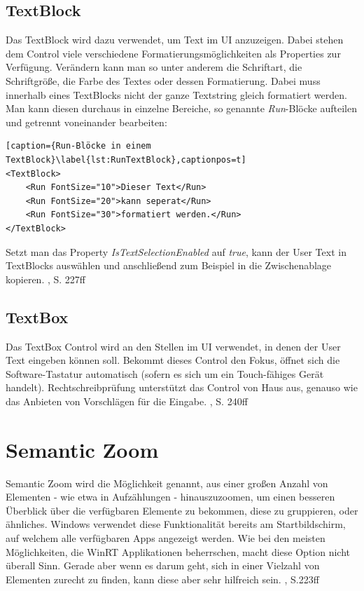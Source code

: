 \documentclass[a4paper,bibtotoc,oneside]{scrbook}
\begin{document}
\subsection[TextBlock]{TextBlock}
Das TextBlock wird dazu verwendet, um Text im UI anzuzeigen. Dabei stehen dem Control viele verschiedene Formatierungsmöglichkeiten als Properties zur Verfügung. Verändern kann man so unter anderem die Schriftart, die Schriftgröße, die Farbe des Textes oder dessen Formatierung.
\newline
Dabei muss innerhalb eines TextBlocks nicht der ganze Textstring gleich formatiert werden. Man kann diesen durchaus in einzelne Bereiche, so genannte \textit{Run}-Blöcke aufteilen und getrennt voneinander bearbeiten:
\newline
\begin{lstlisting}[caption={Run-Blöcke in einem TextBlock}\label{lst:RunTextBlock},captionpos=t]
<TextBlock>
	<Run FontSize="10">Dieser Text</Run>
	<Run FontSize="20">kann seperat</Run>
	<Run FontSize="30">formatiert werden.</Run>
</TextBlock>
\end{lstlisting}
Setzt man das Property \textit{IsTextSelectionEnabled} auf \textit{true}, kann der User Text in TextBlocks auswählen und anschließend zum Beispiel in die Zwischenablage kopieren.
\cite{ana12}, S. 227ff

\subsection[TextBox]{TextBox}
Das TextBox Control wird an den Stellen im UI verwendet, in denen der User Text eingeben können soll. Bekommt dieses Control den Fokus, öffnet sich die Software-Tastatur automatisch (sofern es sich um ein Touch-fähiges Gerät handelt). Rechtschreibprüfung unterstützt das Control von Haus aus, genauso wie das Anbieten von Vorschlägen für die Eingabe. \cite{ana12}, S. 240ff

\section[Semantic Zoom]{Semantic Zoom}
Semantic Zoom wird die Möglichkeit genannt, aus einer großen Anzahl von Elementen - wie etwa in Aufzählungen - hinauszuzoomen, um einen besseren Überblick über die verfügbaren Elemente zu bekommen, diese zu gruppieren, oder ähnliches. Windows verwendet diese Funktionalität bereits am Startbildschirm, auf welchem alle verfügbaren Apps angezeigt werden.
\newline
\newline
Wie bei den meisten Möglichkeiten, die WinRT Applikationen beherrschen, macht diese Option nicht überall Sinn. Gerade aber wenn es darum geht, sich in einer Vielzahl von Elementen zurecht zu finden, kann diese aber sehr hilfreich sein. \cite{ana12}, S.223ff
\end{document}
